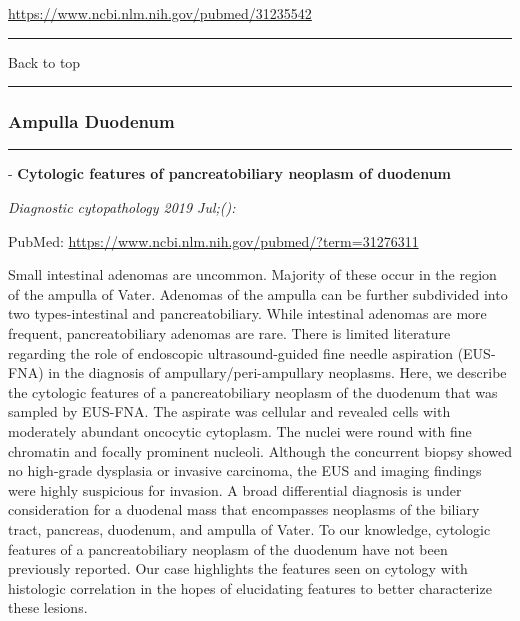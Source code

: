 \documentclass[]{article}
\begin{document}
\url{https://www.ncbi.nlm.nih.gov/pubmed/31235542}

\begin{center}\rule{0.5\linewidth}{\linethickness}\end{center}

Back to top

\begin{center}\rule{0.5\linewidth}{\linethickness}\end{center}

\pagebreak

\hypertarget{ampulla-duodenum}{%
\subsubsection{Ampulla Duodenum}\label{ampulla-duodenum}}

\begin{center}\rule{0.5\linewidth}{\linethickness}\end{center}

 - \textbf{Cytologic features of pancreatobiliary neoplasm of duodenum}

\emph{Diagnostic cytopathology 2019 Jul;():}

PubMed: \url{https://www.ncbi.nlm.nih.gov/pubmed/?term=31276311}

Small intestinal adenomas are uncommon. Majority of these occur in the
region of the ampulla of Vater. Adenomas of the ampulla can be further
subdivided into two types-intestinal and pancreatobiliary. While
intestinal adenomas are more frequent, pancreatobiliary adenomas are
rare. There is limited literature regarding the role of endoscopic
ultrasound-guided fine needle aspiration (EUS-FNA) in the diagnosis of
ampullary/peri-ampullary neoplasms. Here, we describe the cytologic
features of a pancreatobiliary neoplasm of the duodenum that was sampled
by EUS-FNA. The aspirate was cellular and revealed cells with moderately
abundant oncocytic cytoplasm. The nuclei were round with fine chromatin
and focally prominent nucleoli. Although the concurrent biopsy showed no
high-grade dysplasia or invasive carcinoma, the EUS and imaging findings
were highly suspicious for invasion. A broad differential diagnosis is
under consideration for a duodenal mass that encompasses neoplasms of
the biliary tract, pancreas, duodenum, and ampulla of Vater. To our
knowledge, cytologic features of a pancreatobiliary neoplasm of the
duodenum have not been previously reported. Our case highlights the
features seen on cytology with histologic correlation in the hopes of
elucidating features to better characterize these lesions.
\end{document}
